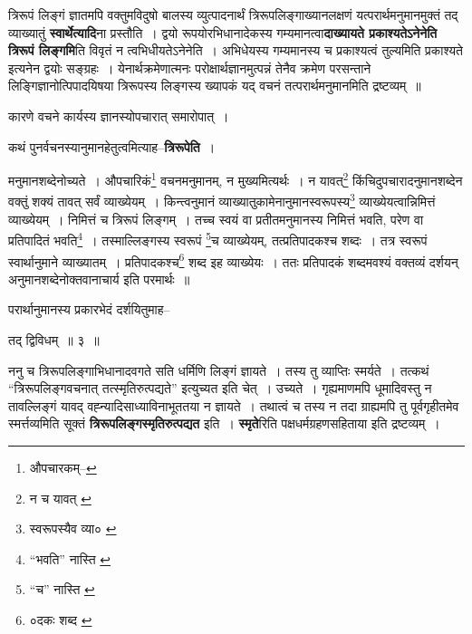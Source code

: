 \documentclass[article,12pt,a4paper]{memoir}
\begin{document}
	  \endgroup
	

	  \pstart त्रिरूपं लिङ्गं ज्ञातमपि वक्तुमविदुषो बालस्य व्युत्पादनार्थं त्रिरूपलिङ्गाख्यानलक्षणं यत्परार्थमनुमानमुक्तं तद् व्याख्यातुं \textbf{स्वार्थेत्यादि}ना प्रस्तौति । द्वयो रूपयोरभिधानादेकस्य गम्यमानत्वा\textbf{दाख्यायते प्रकाश्यतेऽनेनेति त्रिरूपं लिङ्गमि}ति विवृतं न त्वभिधीयतेऽनेनेति । अभिधेयस्य गम्यमानस्य च प्रकाश्यत्वं तुल्यमिति प्रकाश्यते इत्यनेन द्वयोः सङ्ग्रहः । येनार्थक्रमेणात्मनः परोक्षार्थज्ञानमुत्पन्नं तेनैव क्रमेण परसन्ताने लिङ्गिज्ञानोत्पिपादयिषया त्रिरूपस्य लिङ्गस्य ख्यापकं यद् वचनं तत्परार्थमनुमानमिति द्रष्टव्यम् ॥
	\pend
      

	  \pstart कारणे वचने कार्यस्य ज्ञानस्योपचारात् समारोपात् ।
	\pend
      

	  \pstart कथं पुनर्वचनस्यानुमानहेतुत्वमित्याह--\textbf{त्रिरूपेति} ।
	\pend
	  \bigskip
	  \begingroup
	

	  \pstart मनुमानशब्देनोच्यते । औपचारिकं\footnote{औपचारकम्--\cite{dp-msA}} वचनमनुमानम्, न मुख्यमित्यर्थः । न यावत्\footnote{न च यावत् \cite{dp-msA} \cite{dp-msB} \cite{dp-msD} \cite{dp-edP} \cite{dp-edH} \cite{dp-edE} \cite{dp-edN}} किंचिदुपचारादनुमानशब्देन वक्तुं शक्यं तावत् सर्वं व्याख्येयम् । किन्त्वनुमानं व्याख्यातुकामेनानुमानस्वरूपस्य\footnote{स्वरूपस्यैव व्या० \cite{dp-msC}} व्याख्येयत्वान्निमित्तं व्याख्येयम् । निमित्तं च त्रिरूपं लिङ्गम् । तच्च स्वयं वा प्रतीतमनुमानस्य निमित्तं भवति, परेण वा प्रतिपादितं भवति\footnote{“भवति” नास्ति \cite{dp-msA} \cite{dp-msC} \cite{dp-edP} \cite{dp-edE} \cite{dp-edN}} । तस्माल्लिङ्गस्य स्वरूपं \footnote{“च” नास्ति \cite{dp-msA} \cite{dp-edP} \cite{dp-edH} \cite{dp-edE} \cite{dp-edN}}\-च व्याख्येयम्, तत्प्रतिपादकश्च शब्दः । तत्र स्वरूपं स्वार्थानुमाने व्याख्यातम् । प्रतिपादकश्च\footnote{०दकः शब्द \cite{dp-msA} \cite{dp-msB} \cite{dp-edP} \cite{dp-edH} \cite{dp-edE} \cite{dp-edN}} शब्द इह व्याख्येयः । ततः प्रतिपादकं शब्दमवश्यं वक्तव्यं दर्शयन् अनुमानशब्देनोक्तवानाचार्य इति परमार्थः ॥
	\pend
       

	  \pstart परार्थानुमानस्य प्रकारभेदं दर्शयितुमाह--
	\pend
      
	  \endgroup
	
	  \bigskip
	  \begingroup
	

	  \pstart तद् द्विविधम् ॥ ३ ॥
	\pend
      
	  \endgroup
	

	  \pstart ननु च त्रिरूपलिङ्गाभिधानादवगते सति धर्मिणि लिङ्गं ज्ञायते । तस्य तु व्याप्तिः स्मर्यते । तत्कथं “त्रिरूपलिङ्गवचनात् तत्स्मृतिरुत्पद्यते” इत्युच्यत इति चेत् । उच्यते । गृह्यमाणमपि धूमादिवस्तु न तावल्लिङ्गं यावद् वह्न्यादिसाध्याविनाभूततया न ज्ञायते । तथात्वं च तस्य न तदा ग्राह्यमपि तु पूर्वगृहीतमेव स्मर्त्तव्यमिति सूक्तं \textbf{त्रिरूपलिङ्गस्मृतिरुत्पद्यत} इति । \textbf{स्मृते}रिति पक्षधर्मग्रहणसहिताया इति द्रष्टव्यम् ।
	\pend
      
\end{document}
